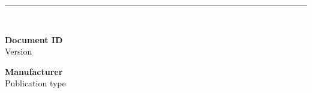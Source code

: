 \documentclass{article}
\begin{document}
\begin{titlepage}
	\rule{\textwidth}{1pt}\\[0.5em]
	\begin{minipage}{0.5\textwidth}
		\begin{flushleft}
			\textbf{Document ID}\\
			Version
		\end{flushleft}
	\end{minipage}
	\hfill
	\begin{minipage}{0.5\textwidth}
		\begin{flushright}
			\textbf{Manufacturer}\\Publication type
		\end{flushright}		
	\end{minipage}
\end{titlepage}
\end{document}

